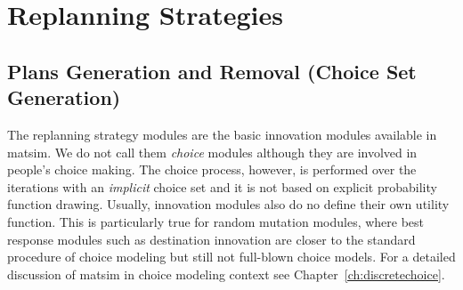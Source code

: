 
\section{Replanning Strategies}
\label{sec:strategymodules}

\subsection{Plans Generation and Removal (Choice Set Generation)}

 

The replanning strategy modules are the basic innovation modules available in \gls{matsim}. We do not call them \emph{choice} modules although they are involved in people's choice making. The choice process, however, is performed over the iterations with an \emph{implicit} choice set and it is not based on explicit probability function drawing. Usually, innovation modules also do no define their own utility function. This is particularly true for random mutation modules, where best response modules such as destination innovation are closer to the standard procedure of choice modeling but still not full-blown choice models. For a detailed discussion of \gls{matsim} in choice modeling context see Chapter~\ref{ch:discretechoice}.

